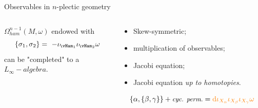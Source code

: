 \documentclass[10pt]{beamer}
\begin{document}
\begin{frame}{Observables in $n$-plectic geometry}
    \pause
    \vfill
        \begin{columns}[T]
          \pause
          \setlength{\belowdisplayskip}{5pt}
          \begin{column}{.50\linewidth}
            \vspace{-1em}
            \begin{thmblock}
              $\Omega^{n-1}_{ham}(M,\omega)$ endowed with
              \vspace{-.5em}
              \begin{displaymath}
                \lbrace \sigma_1, \sigma_2 \rbrace =
                ~ - \iota_{\vHam_1}\iota_{\vHam_2} \omega
              \end{displaymath}
    can be "completed" to a \\ $L_\infty-algebra$.
            \end{thmblock}
          \end{column}
    \pause
          \begin{column}{.50\linewidth}
            \begin{itemize}
              \item[\cmark] Skew-symmetric;
              \item[\xmark] multiplication of observables;
              \item[\xmark] Jacobi equation;
              \item[\smark] Jacobi equation \emph{up to homotopies}.
            \end{itemize}
    \[
    \small
    \{\alpha,\{\beta,\gamma\}\} + \text{\it cyc. perm.}
    = {\color{orange}\mathrm{d} \iota_{X_\alpha} \iota_{X_\beta} \iota_{X_\gamma}\omega}
    \]
          \end{column}
        \end{columns}

\end{frame}
\end{document}
